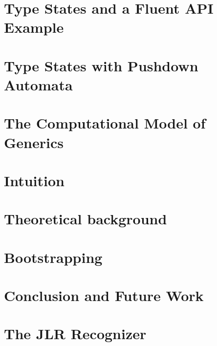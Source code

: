 \documentclass[nonatbib,preprint,numbers]{sigplanconf}
\begin{document}
\section{Type States and a Fluent API Example}
\label{section:example}


\section{Type States with Pushdown Automata}
\label{section:generalization}


\section{The Computational Model of \protect\Java Generics}
\label{section:background}


\section{Intuition}
\label{section:recognizer}


\section{Theoretical background}
\label{section:theoretical-background}


\section{Bootstrapping \Fajita}
\label{section:bootstrapping}


\section{Conclusion and Future Work}
\label{section:zz}


\small


\clearpage
\appendix
\section{The JLR Recognizer}

\end{document}
